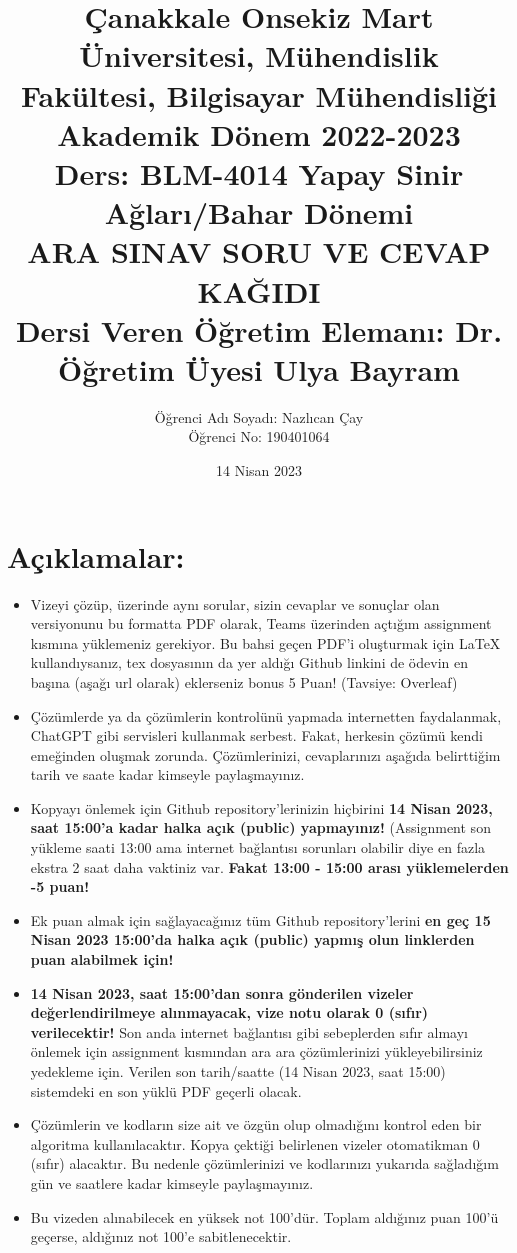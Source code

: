 \documentclass[11pt]{article}
\title{Çanakkale Onsekiz Mart Üniversitesi, Mühendislik Fakültesi, Bilgisayar Mühendisliği Akademik Dönem 2022-2023\\
Ders: BLM-4014 Yapay Sinir Ağları/Bahar Dönemi\\ 
ARA SINAV SORU VE CEVAP KAĞIDI\\
Dersi Veren Öğretim Elemanı: Dr. Öğretim Üyesi Ulya Bayram}
\author{%
\begin{minipage}{\textwidth}
\raggedright
Öğrenci Adı Soyadı: Nazlıcan Çay \\ %
Öğrenci No: 190401064
\end{minipage}%
}
\date{14 Nisan 2023}
\begin{document}
\maketitle

\vspace{-.5in}
\section*{Açıklamalar:}
\begin{itemize}
    \item Vizeyi çözüp, üzerinde aynı sorular, sizin cevaplar ve sonuçlar olan versiyonunu bu formatta PDF olarak, Teams üzerinden açtığım assignment kısmına yüklemeniz gerekiyor. Bu bahsi geçen PDF'i oluşturmak için LaTeX kullandıysanız, tex dosyasının da yer aldığı Github linkini de ödevin en başına (aşağı url olarak) eklerseniz bonus 5 Puan! (Tavsiye: Overleaf)
    \item Çözümlerde ya da çözümlerin kontrolünü yapmada internetten faydalanmak, ChatGPT gibi servisleri kullanmak serbest. Fakat, herkesin çözümü kendi emeğinden oluşmak zorunda. Çözümlerinizi, cevaplarınızı aşağıda belirttiğim tarih ve saate kadar kimseyle paylaşmayınız. 
    \item Kopyayı önlemek için Github repository'lerinizin hiçbirini \textbf{14 Nisan 2023, saat 15:00'a kadar halka açık (public) yapmayınız!} (Assignment son yükleme saati 13:00 ama internet bağlantısı sorunları olabilir diye en fazla ekstra 2 saat daha vaktiniz var. \textbf{Fakat 13:00 - 15:00 arası yüklemelerden -5 puan!}
    \item Ek puan almak için sağlayacağınız tüm Github repository'lerini \textbf{en geç 15 Nisan 2023 15:00'da halka açık (public) yapmış olun linklerden puan alabilmek için!}
    \item \textbf{14 Nisan 2023, saat 15:00'dan sonra gönderilen vizeler değerlendirilmeye alınmayacak, vize notu olarak 0 (sıfır) verilecektir!} Son anda internet bağlantısı gibi sebeplerden sıfır almayı önlemek için assignment kısmından ara ara çözümlerinizi yükleyebilirsiniz yedekleme için. Verilen son tarih/saatte (14 Nisan 2023, saat 15:00) sistemdeki en son yüklü PDF geçerli olacak.
    \item Çözümlerin ve kodların size ait ve özgün olup olmadığını kontrol eden bir algoritma kullanılacaktır. Kopya çektiği belirlenen vizeler otomatikman 0 (sıfır) alacaktır. Bu nedenle çözümlerinizi ve kodlarınızı yukarıda sağladığım gün ve saatlere kadar kimseyle paylaşmayınız.
    \item Bu vizeden alınabilecek en yüksek not 100'dür. Toplam aldığınız puan 100'ü geçerse, aldığınız not 100'e sabitlenecektir.

\end{itemize}
\end{document}
